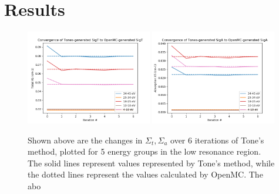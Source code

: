 \documentclass[10pt]{article}
\begin{document}
\newpage



  \section{Results}
  \begin{figure}
    \begin{center}
    \includegraphics[width=0.49\textwidth]{convergence_of_tones_sigT}
    \includegraphics[width=0.49\textwidth]{convergence_of_tones_sigA}
    \caption{Shown above are the changes in $\Sigma_t,\Sigma_a$ over 6 iterations of Tone's method, plotted for 5 energy groups in the low resonance region. The solid lines represent values represented by Tone's method, while the dotted lines represent the values calculated by OpenMC. The abo }
    \end{center}
  \end{figure}

  

\end{document}

